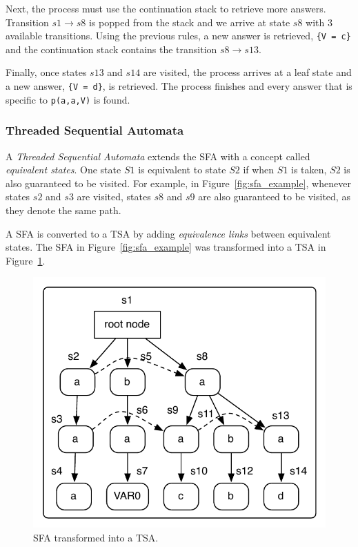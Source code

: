 Next, the process must use the continuation stack to retrieve more answers. Transition $s1 \rightarrow s8$ is popped from the stack
and we arrive at state $s8$ with 3 available transitions. Using the previous rules, a new answer is retrieved,
\texttt{\{V = c\}} and the continuation stack contains the transition $s8 \rightarrow s13$.

Finally, once states $s13$ and $s14$ are visited, the process arrives at a leaf state and a new answer,
\texttt{\{V = d\}}, is retrieved. The process finishes and every answer that is specific to \texttt{p(a,a,V)} is found.

\subsubsection{Threaded Sequential Automata}

A \textit{Threaded Sequential Automata} extends the SFA with a concept called
\textit{equivalent states}. One state $S1$ is equivalent to state $S2$ if when $S1$ is taken, $S2$ is also
guaranteed to be visited. For example, in Figure~\ref{fig:sfa_example}, whenever states $s2$ and $s3$ are
visited, states $s8$ and $s9$ are also guaranteed to be visited, as they denote the same path.

A SFA is converted to a TSA by adding \textit{equivalence links} between equivalent states.
The SFA in Figure~\ref{fig:sfa_example} was transformed into a TSA in Figure~\ref{fig:tsa_example}.

\begin{figure}[ht]
  \centering
    \includegraphics[scale=0.6]{tsa.pdf}
  \caption{SFA transformed into a TSA.}
  \label{fig:tsa_example}
\end{figure}

